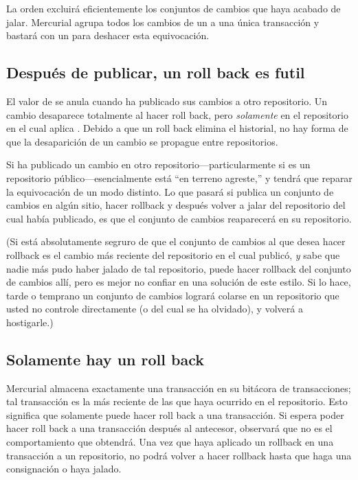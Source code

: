 La orden  excluirá eficientemente los conjuntos de
cambios que haya acabado de jalar.  Mercurial agrupa todos los cambios
de un  a una única transacción y bastará con un
 para deshacer esta equivocación.

\subsection{Después de publicar, un roll back es futil}
\label{sec:undo:rollback-after-push}

El valor de  se anula cuando ha publicado sus cambios
a otro repositorio.  Un cambio desaparece totalmente al hacer roll back,
pero \emph{solamente} en el repositorio en el cual aplica
.  Debido a que un roll back elimina el historial,
no hay forma de que la desaparición de un cambio se propague entre
repositorios.

Si ha publicado un cambio en otro repositorio---particularmente si es
un repositorio público---esencialmente está ``en terreno agreste,''
y tendrá que reparar la equivocación de un modo distinto.  Lo que
pasará si publica un conjunto de cambios en algún sitio, hacer
rollback y después volver a jalar del repositorio del cual había
publicado, es que el conjunto de cambios reaparecerá en su repositorio.

(Si está absolutamente segruro de que el conjunto de cambios al que
desea hacer rollback es el cambio más reciente del repositorio en el
cual publicó, \emph{y} sabe que nadie más pudo haber jalado de tal
repositorio, puede hacer rollback del conjunto de cambios allí, pero
es mejor no confiar en una solución de este estilo.  Si lo hace, tarde
o temprano un conjunto de cambios logrará colarse en un repositorio
que usted no controle directamente (o del cual se ha olvidado), y
volverá a hostigarle.)

\subsection{Solamente hay un roll back}

Mercurial almacena exactamente una transacción en su bitácora de
transacciones; tal transacción es la más reciente de las que haya
ocurrido en el repositorio. Esto significa que solamente puede hacer
roll back a una transacción. Si espera poder hacer roll back a una
transacción después al antecesor, observará que no es el
comportamiento que obtendrá.
Una vez que haya aplicado un rollback en una transacción a un
repositorio, no podrá volver a hacer rollback hasta que haga una
consignación o haya jalado.

